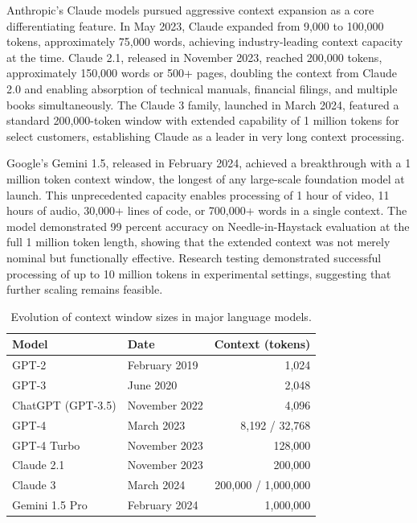 \documentclass[11pt,letterpaper]{article}
\begin{document}
Anthropic's Claude models pursued aggressive context expansion as a core differentiating feature. In May 2023, Claude expanded from 9,000 to 100,000 tokens, approximately 75,000 words, achieving industry-leading context capacity at the time. Claude 2.1, released in November 2023, reached 200,000 tokens, approximately 150,000 words or 500+ pages, doubling the context from Claude 2.0 and enabling absorption of technical manuals, financial filings, and multiple books simultaneously. The Claude 3 family, launched in March 2024, featured a standard 200,000-token window with extended capability of 1 million tokens for select customers, establishing Claude as a leader in very long context processing.

Google's Gemini 1.5, released in February 2024, achieved a breakthrough with a 1 million token context window, the longest of any large-scale foundation model at launch. This unprecedented capacity enables processing of 1 hour of video, 11 hours of audio, 30,000+ lines of code, or 700,000+ words in a single context. The model demonstrated 99 percent accuracy on Needle-in-Haystack evaluation at the full 1 million token length, showing that the extended context was not merely nominal but functionally effective. Research testing demonstrated successful processing of up to 10 million tokens in experimental settings, suggesting that further scaling remains feasible.

\begin{table}[H]
\centering
\caption{Evolution of context window sizes in major language models.}
\begin{tabular}{llr}
\toprule
\textbf{Model} & \textbf{Date} & \textbf{Context (tokens)} \\
\midrule
GPT-2 & February 2019 & 1,024 \\
GPT-3 & June 2020 & 2,048 \\
ChatGPT (GPT-3.5) & November 2022 & 4,096 \\
GPT-4 & March 2023 & 8,192 / 32,768 \\
GPT-4 Turbo & November 2023 & 128,000 \\
Claude 2.1 & November 2023 & 200,000 \\
Claude 3 & March 2024 & 200,000 / 1,000,000 \\
Gemini 1.5 Pro & February 2024 & 1,000,000 \\
\bottomrule
\end{tabular}
\end{table}
\end{document}
